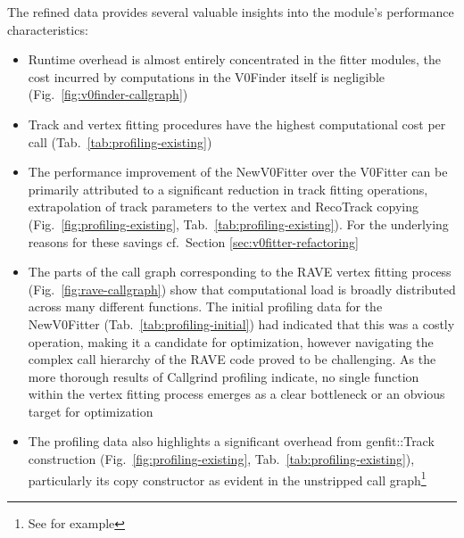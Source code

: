 The refined data provides several valuable insights into the module's performance characteristics:
\begin{itemize}
  \item Runtime overhead is almost entirely concentrated in the fitter modules, the cost incurred by computations in the V0Finder itself is negligible (Fig.\ \ref{fig:v0finder-callgraph})
  \item Track and vertex fitting procedures have the highest computational cost per call (Tab.\ \ref{tab:profiling-existing})
  \item The performance improvement of the NewV0Fitter over the V0Fitter can be primarily attributed to a significant reduction in track fitting operations, extrapolation of track parameters to the vertex and RecoTrack copying (Fig.\ \ref{fig:profiling-existing}, Tab.\ \ref{tab:profiling-existing}). For the underlying reasons for these savings cf.\ Section \ref{sec:v0fitter-refactoring}
  \item The parts of the call graph corresponding to the RAVE vertex fitting process (Fig.\ \ref{fig:rave-callgraph}) show that computational load is broadly distributed across many different functions. The initial profiling data for the NewV0Fitter (Tab.\ \ref{tab:profiling-initial}) had indicated that this was a costly operation, making it a candidate for optimization, however navigating the complex call hierarchy of the RAVE code proved to be challenging. As the more thorough results of Callgrind profiling indicate, no single function within the vertex fitting process emerges as a clear bottleneck or an obvious target for optimization
  \item The profiling data also highlights a significant overhead from genfit::Track construction (Fig.\ \ref{fig:profiling-existing}, Tab.\ \ref{tab:profiling-existing}), particularly its copy constructor as evident in the unstripped call graph\footnote{See for example }
\end{itemize}
